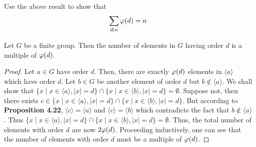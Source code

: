 \begin{exercise}
	Use the above result to show that 
	$$
	\sum_{d\mid n}\varphi(d) = n
	$$
\end{exercise}

\begin{proposition}
	Let $G$ be a finite group. Then the number of elements in $G$ having order $d$ is a multiple of $\varphi(d)$.
\end{proposition}
\begin{proof}
	Let $a\in G$ have order $d$. Then, there are exactly $\varphi(d)$ elements in $\langle a\rangle$ which have order $d$. Let $b\in G$ be another element of order $d$ but $b\notin\langle a\rangle$. We shall show that $\{x\mid x\in\langle a\rangle, |x|=d\}\cap\{x\mid x\in\langle b\rangle, |x|=d\}=\emptyset$. Suppose not, then there exists $c\in\{x\mid x\in\langle a\rangle, |x|=d\}\cap\{x\mid x\in\langle b\rangle, |x|=d\}$. But according to \textbf{Proposition 4.22}, $\langle c\rangle=\langle a\rangle$ and $\langle c\rangle = \langle b\rangle$ which contradicts the fact that $b\notin\langle a\rangle$. Thus $\{x\mid x\in\langle a\rangle, |x|=d\}\cap\{x\mid x\in\langle b\rangle, |x|=d\}=\emptyset$. Thus, the total number of elements with order $d$ are now $2\varphi(d)$. Proceeding inductively, one can see that the number of elements with order $d$ must be a multiple of $\varphi(d)$.
\end{proof}